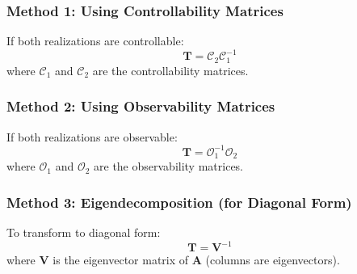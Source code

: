 \subsubsection{Method 1: Using Controllability Matrices}

If both realizations are controllable:
\begin{equation}
\mathbf{T} = \mathcal{C}_2 \mathcal{C}_1^{-1}
\label{eq:T_controllability}
\end{equation}
where $\mathcal{C}_1$ and $\mathcal{C}_2$ are the controllability matrices.

\subsubsection{Method 2: Using Observability Matrices}

If both realizations are observable:
\begin{equation}
\mathbf{T} = \mathcal{O}_1^{-1}\mathcal{O}_2
\label{eq:T_observability}
\end{equation}
where $\mathcal{O}_1$ and $\mathcal{O}_2$ are the observability matrices.

\subsubsection{Method 3: Eigendecomposition (for Diagonal Form)}

To transform to diagonal form:
\begin{equation}
\mathbf{T} = \mathbf{V}^{-1}
\end{equation}
where $\mathbf{V}$ is the eigenvector matrix of $\mathbf{A}$ (columns are eigenvectors).

